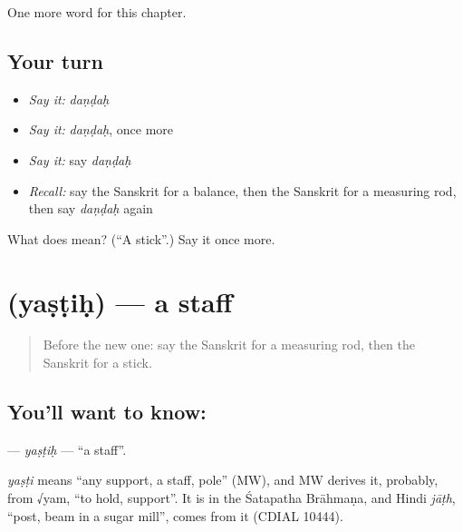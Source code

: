 \begin{grammarlens}[title={What you've built}]
One more word for this chapter.
\end{grammarlens}

\subsection*{Your turn}
\begin{itemize}
\raggedright
  \item \emph{Say it:} \emph{daṇḍaḥ}
  \item \emph{Say it:} \emph{daṇḍaḥ}, once more
  \item \emph{Say it:} say \emph{daṇḍaḥ}
  \item \emph{Recall:} say the Sanskrit for a balance, then the Sanskrit for a measuring rod, then say \emph{daṇḍaḥ} again
\end{itemize}

\begin{tcolorbox}[breakable,colback=teal!4,colframe=teal!35!black,title={Before you move on}]
What does  mean? (\textquotedblleft{}A stick\textquotedblright{}.) Say it once more.
\end{tcolorbox}
\section[\texorpdfstring{\sk{यष्टिः} (yaṣṭiḥ)}{यष्टिः (yaṣṭiḥ)}]{ (yaṣṭiḥ) — a staff}

\label{lesson:SA-C220-yastih}



\begin{quote}
Before the new one: say the Sanskrit for a measuring rod, then the Sanskrit for a stick.
\end{quote}

\subsection*{You'll want to know: }
\textbf{} — \emph{yaṣṭiḥ} — \textquotedblleft{}a staff\textquotedblright{}.

\begin{cousinweb}
\emph{yaṣṭi} means \textquotedblleft{}any support, a staff, pole\textquotedblright{} (MW), and MW derives it, probably, from √yam, \textquotedblleft{}to hold, support\textquotedblright{}. It is in the Śatapatha Brāhmaṇa, and Hindi \emph{jāṭh}, \textquotedblleft{}post, beam in a sugar mill\textquotedblright{}, comes from it (CDIAL 10444).
\end{cousinweb}

